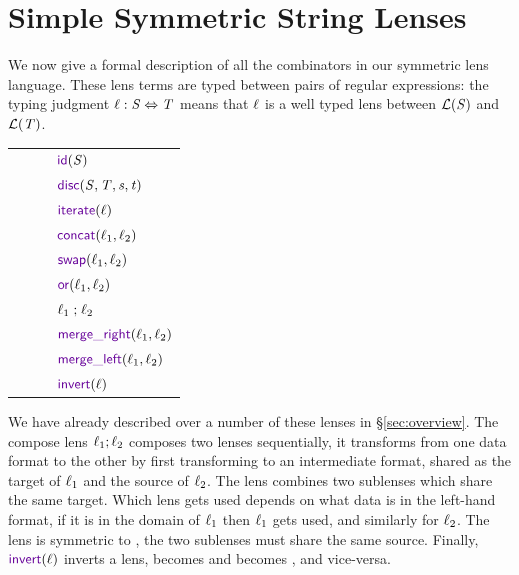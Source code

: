 \documentclass[acmsmall,screen,anonymous]{acmart}
\begin{document}
\section{Simple Symmetric String Lenses}
\label{sec:ssl}
We now give a formal description of all the combinators in our symmetric lens
language. These lens terms are typed between pairs of regular expressions: the
typing judgment $\mathit{\ell} : \mathit{S} \Leftrightarrow \mathit{T}$ means that
$\mathit{\ell}$ is a well typed lens between $\mathcal{L}(\mathit{S})$ and
$\mathcal{L}(\mathit{T})$.

\begin{center}
  \begin{tabular}{l@{\ }l@{\ }l@{\ }l}
    \Lens{} & \GEq{} & & $\IdentityLensOf{\Regex}$\\
            & & \GBar{} & $\DisconnectOf{\Regex}{\RegexAlt}{\String}{\StringAlt}$ \\
            & & \GBar{} & $\IterateLensOf{\Lens}$ \\
            & & \GBar{} & $\ConcatLensOf{\Lens_1}{\Lens_2}$ \\
            & & \GBar{} & $\SwapLensOf{\Lens_1}{\Lens_2}$ \\
            & & \GBar{} & $\OrLensOf{\Lens_1}{\Lens_2}$ \\
            & & \GBar{} & $\mathit{\ell}_1\mathrel{;}\mathit{\ell}_2$ \\
            & & \GBar{} & $\MergeROf{\Lens_1}{\Lens_2}$ \\
            & & \GBar{} & $\MergeLOf{\Lens_1}{\Lens_2}$ \\
            & & \GBar{} & $\InvertOf{\Lens}$ \\
  \end{tabular}
\end{center}

We have already described over a number of these lenses in \S\ref{sec:overview}.
The compose lens $\mathit{\ell}_1 ; \mathit{\ell}_2$ composes two lenses sequentially, it
transforms from one data format to the other by first transforming to an
intermediate format, shared as the target of $\mathit{\ell}_1$ and the source of
$\mathit{\ell}_2$. The \MergeR lens combines two sublenses which share the same target.
Which lens gets used depends on what data is in the left-hand format, if it is
in the domain of $\mathit{\ell}_1$ then $\mathit{\ell}_1$ gets used, and similarly for
$\mathit{\ell}_2$.  The \MergeL lens is symmetric to \MergeR, the two sublenses must
share the same source. Finally, $\InvertOf{\Lens}$ inverts a lens, \CreateR
becomes \CreateL and \PutR becomes \PutL, and vice-versa.
\end{document}
